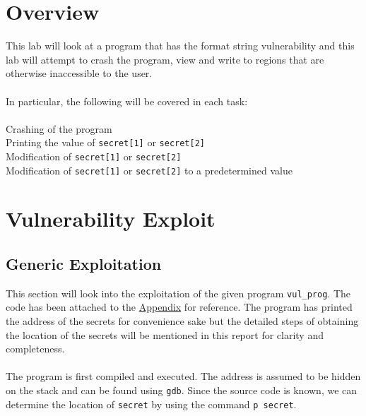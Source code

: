 \documentclass[a4paper,12pt]{article}
\newcommand*\circled[1]{\tikz[baseline=(char.base)]{
		\node[shape=circle,draw,inner sep=2pt] (char) {#1};}}
\begin{document}
\section{Overview}
This lab will look at a program that has the format string vulnerability and this lab will attempt to crash the program, view and write to regions that are otherwise inaccessible to the user.\\\\In particular, the following will be covered in each task:\\\\
\circled{1} Crashing of the program\\\circled{2} Printing the value of \texttt{secret[1]} or \texttt{secret[2]}\\\circled{3} Modification of \texttt{secret[1]} or \texttt{secret[2]}\\\circled{4} Modification of \texttt{secret[1]} or \texttt{secret[2]} to a predetermined value
\newpage
\section{Vulnerability Exploit}
\subsection{Generic Exploitation}
This section will look into the exploitation of the given program \texttt{vul\_prog}. The code has been attached to the \hyperref[Appsec:3.1]{Appendix} for reference. The program has printed the address of the secrets for convenience sake but the detailed steps of obtaining the location of the secrets will be mentioned in this report for clarity and completeness.\\\\The program is first compiled and executed. The address is assumed to be hidden on the stack and can be found using \texttt{gdb}. Since the source code is known, we can determine the location of \texttt{secret} by using the command \texttt{p secret}.
\end{document}
